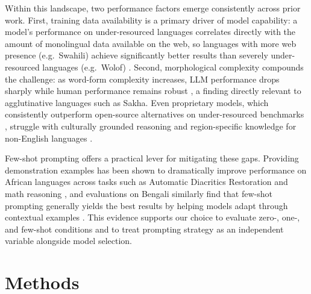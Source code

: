 \documentclass[11pt]{article}
\begin{document}
Within this landscape, two performance factors emerge consistently across prior work.
First, training data availability is a primary driver of model capability: a model's performance on under-resourced languages correlates directly with the amount of monolingual data available on the web, so languages with more web presence (e.g.\ Swahili) achieve significantly better results than severely under-resourced languages (e.g.\ Wolof) \cite{ojo-etal-2025-afrobench}.
Second, morphological complexity compounds the challenge: as word-form complexity increases, LLM performance drops sharply while human performance remains robust \cite{ismayilzada-etal-2025-evaluating}, a finding directly relevant to agglutinative languages such as Sakha.
Even proprietary models, which consistently outperform open-source alternatives on under-resourced benchmarks \cite{ojo-etal-2025-afrobench, jayakody2024performancerecentlargelanguage}, struggle with culturally grounded reasoning and region-specific knowledge for non-English languages \cite{toraman-etal-2026-turkbench}.

Few-shot prompting offers a practical lever for mitigating these gaps.
Providing demonstration examples has been shown to dramatically improve performance on African languages across tasks such as Automatic Diacritics Restoration and math reasoning \cite{ojo-etal-2025-afrobench}, and evaluations on Bengali similarly find that few-shot prompting generally yields the best results by helping models adapt through contextual examples \cite{nazi_evaluation_2025}.
This evidence supports our choice to evaluate zero-, one-, and few-shot conditions and to treat prompting strategy as an independent variable alongside model selection.

\section{Methods}
\end{document}
